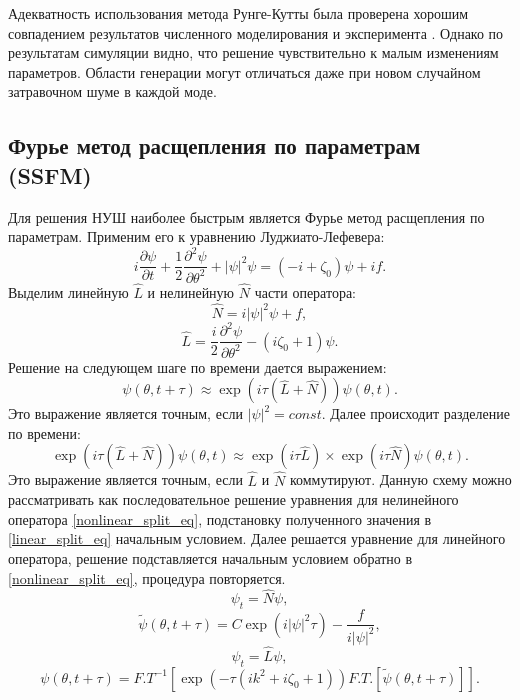 Адекватность использования метода Рунге-Кутты была проверена хорошим совпадением результатов численного моделирования и эксперимента \cite{Herr2014}. Однако по результатам симуляции видно, что решение чувствительно к малым изменениям параметров. Области генерации могут отличаться даже при новом случайном затравочном шуме в каждой моде.

\subsection{Фурье метод расщепления по параметрам (SSFM)}
Для решения НУШ наиболее быстрым является Фурье метод расщепления по параметрам. Применим его к уравнению Луджиато-Лефевера:
\begin{equation}
i\frac{\partial \psi}{\partial t}+\frac{1}{2}\frac{\partial^2 \psi}{\partial \theta^2}+|\psi|^2\psi=(-i+\zeta_0)\psi+if.
\end{equation}
Выделим линейную $\hat{L}$ и нелинейную $\hat{N}$ части оператора:
\begin{equation}
\hat{N}=i|\psi|^2\psi+f,
\end{equation}
\begin{equation}
\hat{L}=\frac{i}{2}\frac{\partial^2\psi}{\partial \theta^2}-(i\zeta_0+1)\psi.
\end{equation}
Решение на следующем шаге по времени дается выражением:
\begin{equation}
\psi(\theta,t+\tau)\approx\exp (i\tau(\hat{L}+\hat{N}))\psi(\theta,t).
\end{equation}
Это выражение является точным, если $|\psi|^2=const$. Далее происходит разделение по времени:
\begin{equation}
\exp (i\tau(\hat{L}+\hat{N}))\psi(\theta,t)
\approx\exp(i\tau\hat{L})\times\exp(i\tau\hat{N})\psi(\theta,t).
\end{equation}
Это выражение является точным, если $\hat{L}$ и $\hat{N}$ коммутируют. Данную схему можно рассматривать как последовательное решение уравнения для нелинейного оператора \eqref{nonlinear_split_eq}, подстановку полученного значения в \eqref{linear_split_eq} начальным условием. Далее решается уравнение для линейного оператора, решение подставляется начальным условием обратно в \eqref{nonlinear_split_eq}, процедура повторяется.
\begin{equation}\label{nonlinear_split_eq}
\psi_t=\hat{N}\psi,
\end{equation}
\begin{equation}
\tilde{\psi}(\theta,t+\tau)=C\exp(i|\psi|^2\tau)-\frac{f}{i|\psi|^2},
\end{equation}
\begin{equation}\label{linear_split_eq}
\psi_t=\hat{L}\psi,
\end{equation}
\begin{equation}
\psi(\theta,t+\tau)=F.T^{-1}[\exp(-\tau(ik^2+i\zeta_0+1))F.T.[\tilde{\psi}(\theta,t+\tau)]].
\end{equation}

